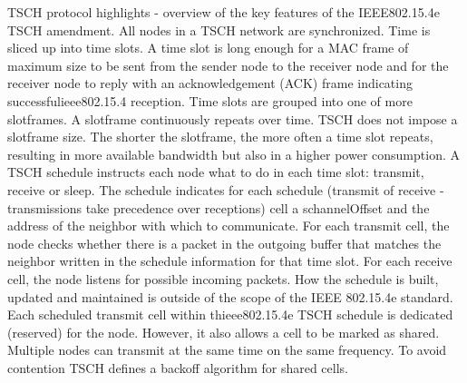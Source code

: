 TSCH protocol highlights - overview of the key features of the IEEE802.15.4e TSCH amendment. All nodes in a TSCH network are synchronized. Time is sliced up into time slots. A time slot is long enough for a MAC frame of maximum size to be sent from the sender node to the receiver node and for the receiver node to reply with an acknowledgement (ACK) frame indicating successfulieee802.15.4 reception. Time slots are grouped into one of more slotframes. A slotframe continuously repeats over time. TSCH does not impose a slotframe size. The shorter the slotframe, the more often a time slot repeats, resulting in more available bandwidth but also in a higher power consumption. A TSCH schedule instructs each node what to do in each time slot: transmit, receive or sleep. The schedule indicates for each schedule (transmit of receive - transmissions take precedence over receptions) cell a schannelOffset and the address of the neighbor with which to communicate. For each transmit cell, the node checks whether there is a packet in the outgoing buffer that matches the neighbor written in the schedule information for that time slot. For each receive cell, the node listens for possible incoming packets. How the schedule is built, updated and maintained is outside of the scope of the IEEE 802.15.4e standard. Each scheduled transmit cell within thieee802.15.4e TSCH schedule is dedicated (reserved) for the node. However, it also allows a cell to be marked as shared. Multiple nodes can transmit at the same time on the same frequency. To avoid contention TSCH defines a backoff algorithm for shared cells. 

